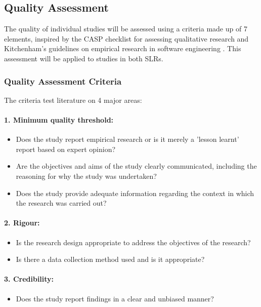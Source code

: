 \documentclass[a4paper,12pt]{article}
\begin{document}
\subsection{Quality Assessment}
The quality of individual studies will be assessed using a criteria made up of 7 elements, inspired by the CASP checklist for assessing qualitative research and Kitchenham's guidelines on empirical research in software engineering . This assessment will be applied to studies in both SLRs.

\subsubsection{Quality Assessment Criteria}
The criteria test literature on 4 major areas:

\paragraph{1. Minimum quality threshold:}
\begin{itemize}
    \item Does the study report empirical research or is it merely a 'lesson learnt' report based on expert opinion?
    \item Are the objectives and aims of the study clearly communicated, including the reasoning for why the study was undertaken?
    \item Does the study provide adequate information regarding the context in which the research was carried out?
\end{itemize}

\paragraph{2. Rigour:}
\begin{itemize}
    \item Is the research design appropriate to address the objectives of the research?
    \item Is there a data collection method used and is it appropriate?
\end{itemize}

\paragraph{3. Credibility:}
\begin{itemize}
    \item Does the study report findings in a clear and unbiased manner?
\end{itemize}
\end{document}
